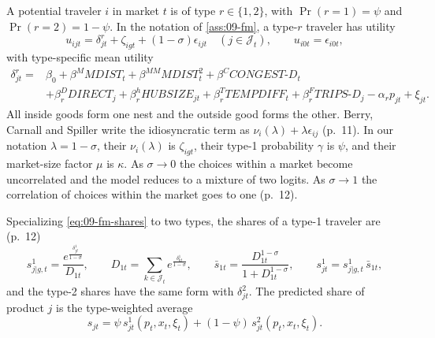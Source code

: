 A potential traveler $i$ in market $t$ is of type $r\in\{1,2\}$, with $\Pr(r=1)=\psi$ and $\Pr(r=2)=1-\psi$.
In the notation of \cref{ass:09-fm}, a type-$r$ traveler has utility
\begin{equation}\label{eq:09-bcs-utility}
u_{ijt}=\delta^r_{jt}+\zeta_{igt}+(1-\sigma)\epsilon_{ijt}\quad(j\in\mathcal{J}_t),\qquad
u_{i0t}=\epsilon_{i0t},
\end{equation}
with type-specific mean utility
\begin{equation}\label{eq:09-bcs-delta-r}
\begin{aligned}
\delta^r_{jt}={}&\beta_0+\beta^{M}\mathit{MDIST}_t+\beta^{MM}\mathit{MDIST}_t^2+\beta^{C}\mathit{CONGEST\text{-}D}_t\\
&+\beta^{D}_r\mathit{DIRECT}_j+\beta^{h}_r\mathit{HUBSIZE}_{jt}+\beta^{T}_r\mathit{TEMPDIFF}_t
+\beta^{F}_r\mathit{TRIPS\text{-}D}_j-\alpha_rp_{jt}+\xi_{jt}.
\end{aligned}
\end{equation}
All inside goods form one nest and the outside good forms the other. Berry, Carnall and Spiller write the
idiosyncratic term as $\nu_i(\lambda)+\lambda\epsilon_{ij}$ (p.~11). In our notation $\lambda=1-\sigma$,
their $\nu_i(\lambda)$ is $\zeta_{igt}$, their type-1 probability $\gamma$ is $\psi$, and their market-size
factor $\mu$ is $\kappa$. As $\sigma\to0$ the choices within a market become uncorrelated and the model
reduces to a mixture of two logits. As $\sigma\to1$ the correlation of choices within the market goes to
one (p.~12).

Specializing \eqref{eq:09-fm-shares} to two types, the shares of a type-1 traveler are (p.~12)
\begin{equation}\label{eq:09-bcs-shares}
s^1_{j|g,t}=\frac{e^{\frac{\delta^1_{jt}}{1-\sigma}}}{D_{1t}},\qquad
D_{1t}=\sum_{k\in\mathcal{J}_t}e^{\frac{\delta^1_{kt}}{1-\sigma}},\qquad
\bar s_{1t}=\frac{D_{1t}^{1-\sigma}}{1+D_{1t}^{1-\sigma}},\qquad
s^1_{jt}=s^1_{j|g,t}\,\bar s_{1t},
\end{equation}
and the type-2 shares have the same form with $\delta^2_{jt}$. The predicted share of product $j$ is the
type-weighted average
\begin{equation}\label{eq:09-bcs-sj}
s_{jt}=\psi\,s^1_{jt}(p_t,x_t,\xi_t)+(1-\psi)\,s^2_{jt}(p_t,x_t,\xi_t).
\end{equation}

